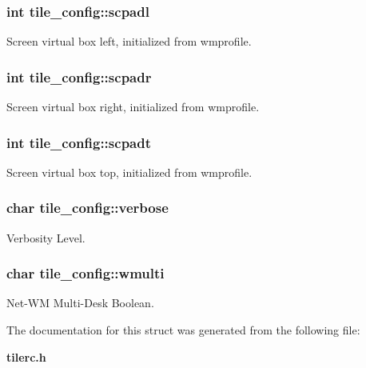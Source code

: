 \subsubsection{\setlength{\rightskip}{0pt plus 5cm}int {\bf tile\_\-config::scpadl}}\label{structtile__config_o8}


Screen virtual box left, initialized from wmprofile. 

\subsubsection{\setlength{\rightskip}{0pt plus 5cm}int {\bf tile\_\-config::scpadr}}\label{structtile__config_o6}


Screen virtual box right, initialized from wmprofile. 

\subsubsection{\setlength{\rightskip}{0pt plus 5cm}int {\bf tile\_\-config::scpadt}}\label{structtile__config_o5}


Screen virtual box top, initialized from wmprofile. 

\subsubsection{\setlength{\rightskip}{0pt plus 5cm}char {\bf tile\_\-config::verbose}}\label{structtile__config_o1}


Verbosity Level. 

\subsubsection{\setlength{\rightskip}{0pt plus 5cm}char {\bf tile\_\-config::wmulti}}\label{structtile__config_o3}


Net-WM Multi-Desk Boolean. 



The documentation for this struct was generated from the following file:\begin{CompactItemize}
\item 
{\bf tilerc.h}\end{CompactItemize}

